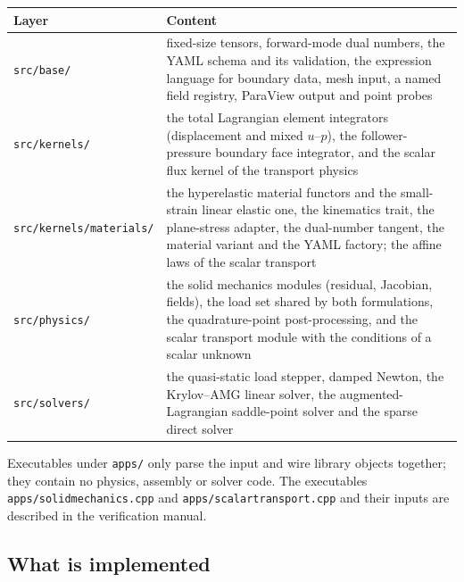\documentclass[11pt]{article}
\DeclareRobustCommand{\file}[1]{{\def\_{\textunderscore\allowbreak}\texttt{#1}}}
\begin{document}
\begin{center}
\small
\begin{tabular}{@{}l p{11.5cm}@{}}
\toprule
Layer & Content \\
\midrule
\file{src/base/} & fixed-size tensors, forward-mode dual numbers, the YAML
  schema and its validation, the expression language for boundary data,
  mesh input, a named field registry, ParaView output and point probes \\
\file{src/kernels/} & the total Lagrangian element integrators
  (displacement and mixed $u$--$p$), the follower-pressure boundary
  face integrator, and the scalar flux kernel of the transport physics \\
\file{src/kernels/materials/} & the hyperelastic material functors and the
  small-strain linear elastic one, the kinematics trait, the plane-stress
  adapter, the dual-number tangent, the material variant and the YAML
  factory; the affine laws of the scalar transport \\
\file{src/physics/} & the solid mechanics modules (residual, Jacobian,
  fields), the load set shared by both formulations, the
  quadrature-point post-processing, and the scalar transport module with
  the conditions of a scalar unknown \\
\file{src/solvers/} & the quasi-static load stepper, damped Newton, the
  Krylov--AMG linear solver, the augmented-Lagrangian saddle-point solver
  and the sparse direct solver \\
\bottomrule
\end{tabular}
\end{center}

Executables under \file{apps/} only parse the input and wire library
objects together; they contain no physics, assembly or solver code.  The
executables \file{apps/solid\_mechanics.cpp} and \file{apps/scalar\_transport.cpp}
and their inputs are described in the verification manual.

\subsection{What is implemented}
\end{document}
